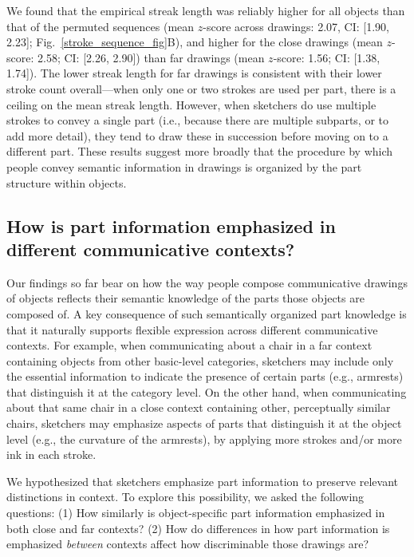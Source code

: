 \documentclass[10pt,letterpaper]{article}
\newcommand{\kushin}[1]{{\color{orange}{[kushin: #1]}}}
\begin{document}

We found that the empirical streak length was reliably higher for all objects than that of the permuted sequences (mean $z$-score across drawings: 2.07, CI: [1.90, 2.23]; Fig.~\ref{stroke_sequence_fig}B), and higher for the close drawings (mean $z$-score: 2.58; CI: [2.26, 2.90]) than far drawings (mean $z$-score: 1.56; CI: [1.38, 1.74]).
The lower streak length for far drawings is consistent with their lower stroke count overall---when only one or two strokes are used per part, there is a ceiling on the mean streak length. 
However, when sketchers do use multiple strokes to convey a single part (i.e., because there are multiple subparts, or to add more detail), they tend to draw these in succession before moving on to a different part.
These results suggest more broadly that the procedure by which people convey semantic information in drawings is organized by the part structure within objects.

\subsection{How is part information emphasized in different communicative contexts?}

Our findings so far bear on how the way people compose communicative drawings of objects reflects their semantic knowledge of the parts those objects are composed of.
A key consequence of such semantically organized part knowledge is that it naturally supports flexible expression across different communicative contexts. 
For example, when communicating about a chair in a far context containing objects from other basic-level categories, sketchers may include only the essential information to indicate the presence of certain parts (e.g., armrests) that distinguish it at the category level. 
On the other hand, when communicating about that same chair in a close context containing other, perceptually similar chairs, sketchers may emphasize aspects of parts that distinguish it at the object level (e.g., the curvature of the armrests), by applying more strokes and/or more ink in each stroke.

We hypothesized that sketchers emphasize part information to preserve relevant distinctions in context. 
To explore this possibility, we asked the following questions: 
(1) How similarly is object-specific part information emphasized in both close and far contexts? 
(2) How do differences in how part information is emphasized \textit{between} contexts affect how discriminable those drawings are?
\end{document}

